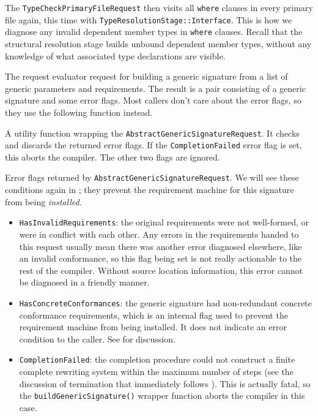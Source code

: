 \documentclass[../generics]{subfiles}
\begin{document}
The \texttt{TypeCheckPrimaryFileRequest} then visits all \texttt{where} clauses in every primary file again, this time with \texttt{TypeResolutionStage::Interface}. This is how we diagnose any invalid dependent member types in \texttt{where} clauses. Recall that the structural resolution stage builds unbound dependent member types, without any knowledge of what associated type declarations are visible.

The request evaluator request for building a generic signature from a list of generic parameters and requirements. The result is a pair consisting of a generic signature and some error flags. Most callers don't care about the error flags, so they use the following function instead.

A utility function wrapping the \texttt{AbstractGenericSignatureRequest}. It checks and discards the returned error flags. If the \texttt{CompletionFailed} error flag is set, this aborts the compiler. The other two flags are ignored.

Error flags returned by \texttt{AbstractGenericSignatureRequest}. We will see these conditions again in ; they prevent the requirement machine for this signature from being \emph{installed}.
\begin{itemize}
\item \texttt{HasInvalidRequirements}: the original requirements were not well-formed, or were in conflict with each other. Any errors in the requirements handed to this request usually mean there was another error diagnosed elsewhere, like an invalid conformance, so this flag being set is not really actionable to the rest of the compiler. Without source location information, this error cannot be diagnosed in a friendly manner.
\item \texttt{HasConcreteConformances}: the generic signature had non-redundant concrete conformance requirements, which is an internal flag used to prevent the requirement machine from being installed. It does not indicate an error condition to the caller. See  for discussion.
\item \texttt{CompletionFailed}: the completion procedure could not construct a finite complete rewriting system within the maximum number of steps (see the discussion of termination that immediately follows ). This is actually fatal, so the \texttt{buildGenericSignature()} wrapper function aborts the compiler in this case.
\end{itemize}
\end{document}

